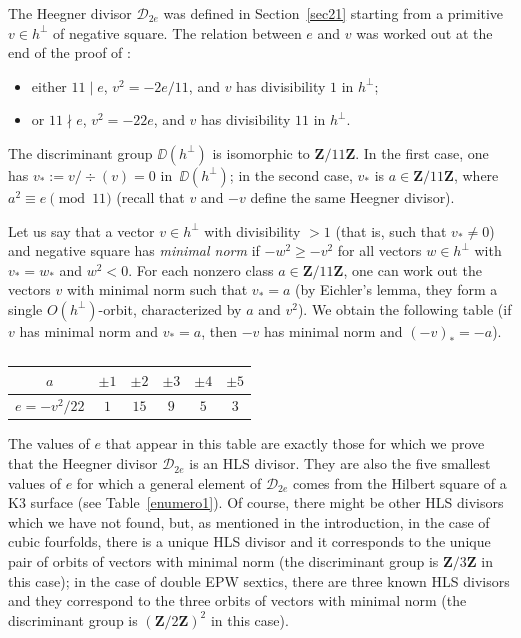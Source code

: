 \documentclass[JEP,XML,SOM,Unicode, NoEqCountersInSection,NoFloatCountersInSection]{cedram}
\let\mathcal\mathscr
\theoremstyle{definition}
\newcommand\Z{{\mathbf Z}}
\newcommand\cD{\mathcal{D}}
\begin{document}
The Heegner divisor $\cD_{2e}$ was defined in Section~\ref{sec21} starting from a primitive $v\in h^\bot$ of negative square. The relation between $e$ and $v$ was worked out at the end of the proof of \cite[Prop.\,4.1]{dm}:
\begin{itemize}
\item either $11\mid e$, $v^2=-2e/11$, and $v$ has divisibility $1$ in $ h^\bot$;
\item or $11\nmid e$, $v^2=-22e $, and $v$ has divisibility $11$ in $ h^\bot$.
\end{itemize}
The discriminant group $\DD(h^\bot) $ is isomorphic to $\Z/11\Z$. In the first case, one has $v_*:=v/\div(v)=0$ in~$\DD(h^\bot)$; in the second case, $v_*$ is $a \in \Z/11\Z$, where $a^2\equiv e\pmod{11}$ (recall that $v$ and $-v$ define the same Heegner divisor).

Let us say that a vector $v\in h^\bot$ with divisibility $>1$ (that is, such that $v_*\ne0$) and negative square has \emph{minimal norm} if $-w^2\ge -v^2$ for all vectors $w\in h^\bot$ with $v_*=w_*$ and $w^2<0$. For each nonzero class $a \in \Z/11\Z$, one can work out the vectors $v$ with minimal norm such that $v_*=a$ (by Eichler's lemma, they form a single $O(h^\bot)$-orbit, characterized by $a$ and $v^2$). We obtain the following table (if $v$ has minimal norm and $v_*=a$, then $-v$ has minimal norm and $(-v)_*=-a$).

\begin{table}[htb!]
\renewcommand\arraystretch{1.5}
\begin{tabular}{|c|c|c|c|c|c|}
\hline
$a$&$\pm 1$&$\pm2$&$\pm3$&$\pm4$&$\pm5$
\\
\hline
$e=-v^2/22$&$1$&$15$&$9$&$5$&$3$
\\
\hline
\end{tabular}
\vspace{\baselineskip}
\caption{}\label{enumero2}
\vspace{-\baselineskip}
\end{table}
The values of $e$ that appear in this table are exactly those for which we prove that the Heegner divisor $\cD_{2e}$ is an HLS divisor. They are also the five smallest values of $e$ for which a general element of $\cD_{2e}$ comes from the Hilbert square of a K3 surface (see Table~\ref{enumero1}). Of course, there might be other HLS divisors which we have not found, but, as mentioned in the introduction, in the case of cubic fourfolds, there is a unique HLS divisor and it corresponds to the unique pair of orbits of vectors with minimal norm (the discriminant group is $\Z/3\Z$ in this case); in the case of double EPW sextics, there are three known HLS divisors and they correspond to the three orbits of vectors with minimal norm (the discriminant group is $(\Z/2\Z)^2$ in this case).
\end{document}
